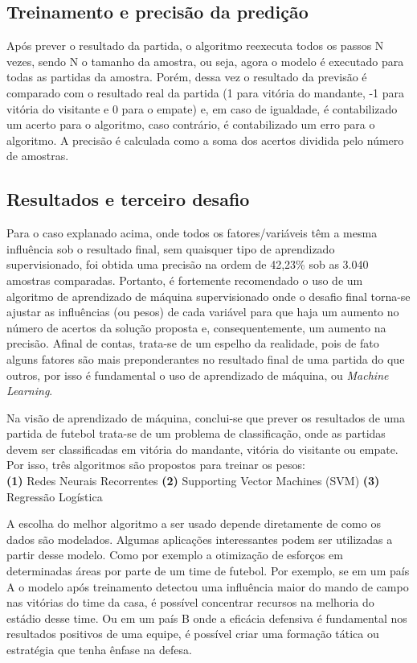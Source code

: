 \subsection{Treinamento e precisão da predição}

Após prever o resultado da partida, o algoritmo reexecuta todos os passos N vezes, sendo N o tamanho da amostra, ou seja, agora o modelo é executado para todas as partidas da amostra. Porém, dessa vez o resultado da previsão é comparado com o resultado real da partida (1 para vitória do mandante, -1 para vitória do visitante e 0 para o empate) e, em caso de igualdade, é contabilizado um acerto para o algoritmo, caso contrário, é contabilizado um erro para o algoritmo. A precisão é calculada como a soma dos acertos dividida pelo número de amostras.

\subsection{Resultados e terceiro desafio}

Para o caso explanado acima, onde todos os fatores/variáveis têm a mesma influência sob o resultado final, sem quaisquer tipo de aprendizado supervisionado, foi obtida uma precisão na ordem de 42,23\% sob as 3.040 amostras comparadas. Portanto, é fortemente recomendado o uso de um algoritmo de aprendizado de máquina supervisionado onde o desafio final torna-se ajustar as influências (ou pesos) de cada variável para que haja um aumento no número de acertos da solução proposta e, consequentemente, um aumento na precisão. Afinal de contas, trata-se de um espelho da realidade, pois de fato alguns fatores são mais preponderantes no resultado final de uma partida do que outros, por isso é fundamental o uso de aprendizado de máquina, ou \textit{Machine Learning}.

Na visão de aprendizado de máquina, conclui-se que prever os resultados de uma partida de futebol trata-se de um problema de classificação, onde as partidas devem ser classificadas em vitória do mandante, vitória do visitante ou empate. Por isso, três algoritmos são propostos para treinar os pesos:
\\

\textbf{(1)} Redes Neurais Recorrentes
\textbf{(2)} Supporting Vector Machines (SVM)
\textbf{(3)} Regressão Logística

A escolha do melhor algoritmo a ser usado depende diretamente de como os dados são modelados. Algumas aplicações interessantes podem ser utilizadas a partir desse modelo. Como por exemplo a otimização de esforços em determinadas áreas por parte de um time de futebol. Por exemplo, se em um país A o modelo após treinamento detectou uma influência maior do mando de campo nas vitórias do time da casa, é possível concentrar recursos na melhoria do estádio desse time. Ou em um país B onde a eficácia defensiva é fundamental nos resultados positivos de uma equipe, é possível criar uma formação tática ou estratégia que tenha ênfase na defesa.

